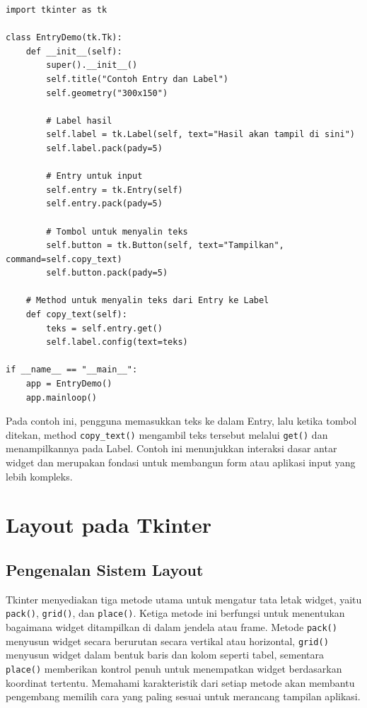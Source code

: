 \begin{lstlisting}[style=PythonStyle, caption={Menyalin Teks dari Entry ke Label Menggunakan Class}, label={lst:b11-menyalin-teks-dari-entry-ke-label}]
import tkinter as tk

class EntryDemo(tk.Tk):
    def __init__(self):
        super().__init__()
        self.title("Contoh Entry dan Label")
        self.geometry("300x150")

        # Label hasil
        self.label = tk.Label(self, text="Hasil akan tampil di sini")
        self.label.pack(pady=5)

        # Entry untuk input
        self.entry = tk.Entry(self)
        self.entry.pack(pady=5)

        # Tombol untuk menyalin teks
        self.button = tk.Button(self, text="Tampilkan", command=self.copy_text)
        self.button.pack(pady=5)

    # Method untuk menyalin teks dari Entry ke Label
    def copy_text(self):
        teks = self.entry.get()
        self.label.config(text=teks)

if __name__ == "__main__":
    app = EntryDemo()
    app.mainloop()
\end{lstlisting}

Pada contoh ini, pengguna memasukkan teks ke dalam Entry, lalu ketika tombol ditekan, method \texttt{copy\_text()} mengambil teks tersebut melalui \texttt{get()} dan menampilkannya pada Label. Contoh ini menunjukkan interaksi dasar antar widget dan merupakan fondasi untuk membangun form atau aplikasi input yang lebih kompleks.


\section{Layout pada Tkinter}

\subsection{Pengenalan Sistem Layout}

Tkinter menyediakan tiga metode utama untuk mengatur tata letak widget, yaitu \texttt{pack()}, \texttt{grid()}, dan \texttt{place()}. Ketiga metode ini berfungsi untuk menentukan bagaimana widget ditampilkan di dalam jendela atau frame. Metode \texttt{pack()} menyusun widget secara berurutan secara vertikal atau horizontal, \texttt{grid()} menyusun widget dalam bentuk baris dan kolom seperti tabel, sementara \texttt{place()} memberikan kontrol penuh untuk menempatkan widget berdasarkan koordinat tertentu. Memahami karakteristik dari setiap metode akan membantu pengembang memilih cara yang paling sesuai untuk merancang tampilan aplikasi.

